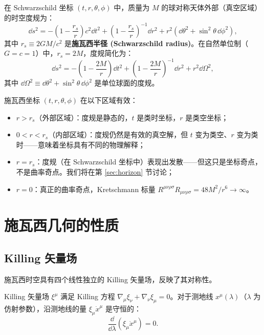 \begin{definition}
在 Schwarzschild 坐标 $(t, r, \theta, \phi)$ 中，质量为 $M$ 的球对称天体外部（真空区域）的时空度规为：
\begin{equation}
    \boxed{\dd s^2 = -\left(1 - \frac{r_s}{r}\right) c^2 \dd t^2 + \left(1 - \frac{r_s}{r}\right)^{-1} \dd r^2 + r^2 (\dd\theta^2 + \sin^2\theta \, \dd\phi^2)},
    \label{eq:schwarz_metric}
\end{equation}
其中 $r_s \equiv 2GM/c^2$ 是\textbf{施瓦西半径 (Schwarzschild radius)}。在自然单位制（$G=c=1$）中，$r_s = 2M$，度规简化为：
\begin{equation}
    \dd s^2 = -\left(1 - \frac{2M}{r}\right) \dd t^2 + \left(1 - \frac{2M}{r}\right)^{-1} \dd r^2 + r^2 \dd\Omega^2,
    \label{eq:schwarz_geom}
\end{equation}
其中 $\dd\Omega^2 \equiv \dd\theta^2 + \sin^2\theta\,\dd\phi^2$ 是单位球面的度规。
\end{definition}

\begin{note}[坐标的有效范围]
施瓦西坐标 $(t,r,\theta,\phi)$ 在以下区域有效：
\begin{itemize}
    \item $r > r_s$（外部区域）：度规是静态的，$t$ 是类时坐标，$r$ 是类空坐标；
    \item $0 < r < r_s$（内部区域）：度规仍然是有效的真空解，但 $t$ 变为类空、$r$ 变为类时——意味着坐标具有不同的物理解释；
    \item $r = r_s$：度规（在 Schwarzschild 坐标中）表现出发散——但这只是坐标奇点，不是曲率奇点。我们将在第 \ref{sec:horizon} 节讨论；
    \item $r = 0$：真正的曲率奇点，Kretschmann 标量 $R^{\mu\nu\rho\sigma}R_{\mu\nu\rho\sigma} = 48M^2/r^6 \to \infty$。
\end{itemize}
\end{note}

\section{施瓦西几何的性质}
\label{sec:geom_prop}

\subsection{Killing 矢量场}

施瓦西时空具有四个线性独立的 Killing 矢量场，反映了其对称性。

\begin{definition}
Killing 矢量场 $\xi^\mu$ 满足 Killing 方程 $\nabla_\mu \xi_\nu + \nabla_\nu \xi_\mu = 0$。对于测地线 $x^\mu(\lambda)$（$\lambda$ 为仿射参数），沿测地线的量 $\xi_\mu \dot x^\mu$ 是守恒的：
\begin{equation}
    \frac{\dd}{\dd\lambda}(\xi_\mu \dot x^\mu) = 0.
\end{equation}
\end{definition}

